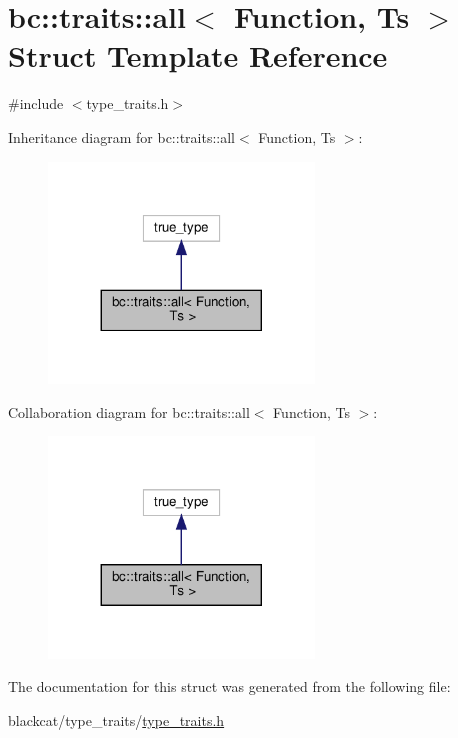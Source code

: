 \hypertarget{structbc_1_1traits_1_1all}{}\section{bc\+:\+:traits\+:\+:all$<$ Function, Ts $>$ Struct Template Reference}
\label{structbc_1_1traits_1_1all}


{\ttfamily \#include $<$type\+\_\+traits.\+h$>$}



Inheritance diagram for bc\+:\+:traits\+:\+:all$<$ Function, Ts $>$\+:\nopagebreak
\begin{figure}[H]
\begin{center}
\leavevmode
\includegraphics[width=200pt]{structbc_1_1traits_1_1all__inherit__graph}
\end{center}
\end{figure}


Collaboration diagram for bc\+:\+:traits\+:\+:all$<$ Function, Ts $>$\+:\nopagebreak
\begin{figure}[H]
\begin{center}
\leavevmode
\includegraphics[width=200pt]{structbc_1_1traits_1_1all__coll__graph}
\end{center}
\end{figure}


The documentation for this struct was generated from the following file\+:\begin{DoxyCompactItemize}
\item 
blackcat/type\+\_\+traits/\hyperlink{type__traits_2type__traits_8h}{type\+\_\+traits.\+h}\end{DoxyCompactItemize}
